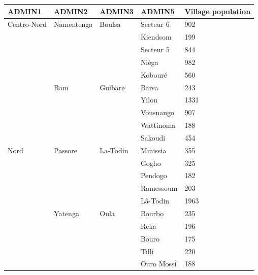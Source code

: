 \begin{table}[h]
    \centering
    \begin{tabular}{lllll}
    \hline
       \textbf{ADMIN1} & \textbf{ADMIN2} & \textbf{ADMIN3} & \textbf{ADMIN5} & \textbf{Village population} \\	 \hline
        Centro-Nord & Namentenga & Boulsa & Secteur 6 & 902 \\ 
        ~ & ~ & ~ & Kiendsom & 199  \\ 
        ~ & ~ & ~ & Secteur 5 & 844  \\ 
        ~ & ~ & ~ & Nièga & 982  \\ 
        ~ & ~ & ~ & Kobouré & 560  \\ 
        ~ & Bam & Guibare & Barsa & 243  \\ 
        ~ & ~ & ~ & Yilou & 1331  \\ 
        ~ & ~ & ~ & Vousnango & 907  \\ 
        ~ & ~ & ~ & Wattinoma & 188  \\ 
        ~ & ~ & ~ & Sakoudi & 454  \\ 
        Nord & Passore & La-Todin & Minissia & 355  \\ 
        ~ & ~ & ~ & Gogho & 325  \\ 
        ~ & ~ & ~ & Pendogo & 182  \\ 
        ~ & ~ & ~ & Ramessoum & 203  \\ 
        ~ & ~ & ~ & Lâ-Todin & 1963  \\ 
        ~ & Yatenga & Oula & Bourbo & 235  \\ 
        ~ & ~ & ~ & Reka & 196  \\ 
        ~ & ~ & ~ & Bouro & 175  \\ 
        ~ & ~ & ~ & Tilli & 220  \\ 
        ~ & ~ & ~ & Ouro Mossi & 188  \\ \hline
    \end{tabular}
\end{table}